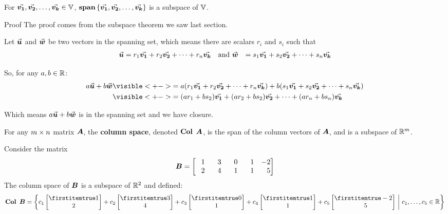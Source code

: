 \documentclass{beamer}
\begin{document}
\begin{frame}
\onslide<+->
\begin{theorem}
For ${\vec{\boldsymbol{v_1}}},{\vec{\boldsymbol{v_2}}},\ldots,{\vec{\boldsymbol{v_k}}}\in\mathbb{V}$, $\operatorname{\textbf{span}}\left\{{\vec{\boldsymbol{v_1}}},{\vec{\boldsymbol{v_2}}},\ldots,{\vec{\boldsymbol{v_k}}}\right\}$ is a subspace of $\mathbb{V}$.
\end{theorem}
\onslide<+->

\begin{block}{Proof}
The proof comes from the subspace theorem we saw last section.

\onslide<+->
Let ${\vec{\boldsymbol{u}}}$ and ${\vec{\boldsymbol{w}}}$ be two vectors in the spanning set, which means there are scalars $r_i$ and $s_i$ such that
\begin{equation*}
\begin{aligned}
{\vec{\boldsymbol{u}}} & =r_1{\vec{\boldsymbol{v_1}}}+ r_2{\vec{\boldsymbol{v_2}}}+\cdots+r_n{\vec{\boldsymbol{v_k}}} & \text{and } &
{\vec{\boldsymbol{w}}} & =s_1{\vec{\boldsymbol{v_1}}}+ s_2{\vec{\boldsymbol{v_2}}}+\cdots+s_n{\vec{\boldsymbol{v_k}}}
\end{aligned}
\end{equation*}

\onslide<+->
So, for any $a,b\in\mathbb{R}$:
\begin{equation*}
\begin{split}
a\vect{u}+b\vect{w} &\visible<+->{=a(r_1\vect{v_1}+ r_2\vect{v_2}+\cdots+r_n\vect{v_k}) + b(s_1\vect{v_1}+ s_2\vect{v_2}+\cdots+s_n\vect{v_k})}\\
&\visible<+->{=(ar_1+bs_2)\vect{v_1}+ (ar_2+bs_2)\vect{v_2}+\cdots+(ar_n+bs_n)\vect{v_k}}
\end{split}
\end{equation*}

\onslide<+->
Which means $a{\vec{\boldsymbol{u}}}+b{\vec{\boldsymbol{w}}}$ is in the spanning set and we have closure.
\end{block}
\end{frame}

\begin{frame}
\begin{definition}
For any $m \times n$ matrix $\boldsymbol{A}$, the \textbf{column space}, denoted $\Col{\mat{A}}$, is the span of the column vectors of $\boldsymbol{A}$, and is a subspace of $\mathbb{R}^m$.
\end{definition}\pause

\begin{example}
Consider the matrix
\begin{equation*}
\mat{B}=
\begin{bmatrix}
\+1 & \+3 & \+0 & \+1 &  -2 \\
\+2 & \+4 & \+1 & \+1 & \+5 \\
\end{bmatrix}
\end{equation*}\pause
The column space of $\boldsymbol{B}$ is a subspace of $\mathbb{R}^2$ and defined:
\begin{equation*}
\Col{\mat{B}} = 
\setbuilder{c_1\bvector{1,2}+
			c_2\bvector{3,4}+
			c_3\bvector{0,1}+
			c_4\bvector{1,1}+
			c_5\bvector{-2,\+5}}
			{c_1,\dots,c_5\in\R}
\end{equation*}
\end{example}
\end{frame}
\end{document}
